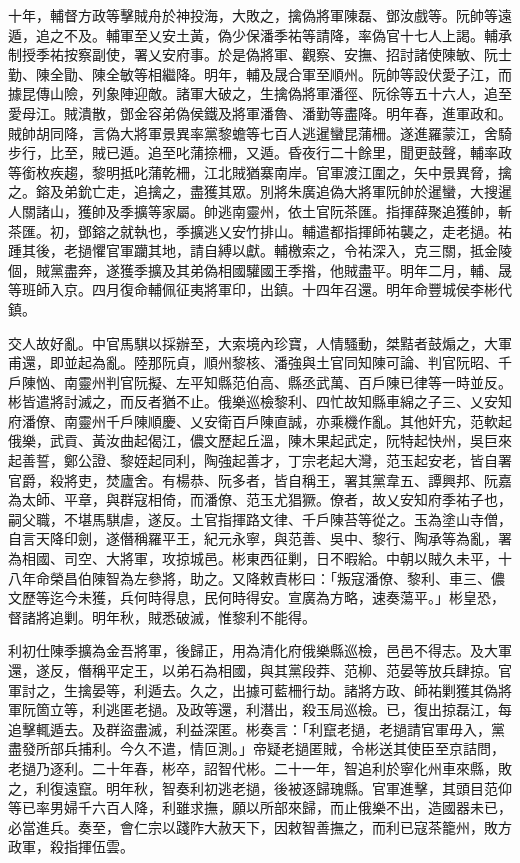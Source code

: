 \begin{pinyinscope}
十年，輔督方政等擊賊舟於神投海，大敗之，擒偽將軍陳磊、鄧汝戲等。阮帥等遠遁，追之不及。輔軍至乂安土黃，偽少保潘季祐等請降，率偽官十七人上謁。輔承制授季祐按察副使，署乂安府事。於是偽將軍、觀察、安撫、招討諸使陳敏、阮士勤、陳全勖、陳全敏等相繼降。明年，輔及晟合軍至順州。阮帥等設伏愛子江，而據昆傳山險，列象陣迎敵。諸軍大破之，生擒偽將軍潘徑、阮徐等五十六人，追至愛母江。賊潰散，鄧金容弟偽侯鐵及將軍潘魯、潘勤等盡降。明年春，進軍政和。賊帥胡同降，言偽大將軍景異率黨黎蟾等七百人逃暹蠻昆蒲柵。遂進羅蒙江，舍騎步行，比至，賊已遁。追至叱蒲捺柵，又遁。昏夜行二十餘里，聞更鼓聲，輔率政等銜枚疾趨，黎明抵叱蒲乾柵，江北賊猶寨南岸。官軍渡江圍之，矢中景異脅，擒之。鎔及弟鈗亡走，追擒之，盡獲其眾。別將朱廣追偽大將軍阮帥於暹蠻，大搜暹人關諸山，獲帥及季擴等家屬。帥逃南靈州，依土官阮茶匯。指揮薛聚追獲帥，斬茶匯。初，鄧鎔之就執也，季擴逃乂安竹排山。輔遣都指揮師祐襲之，走老撾。祐踵其後，老撾懼官軍躪其地，請自縛以獻。輔檄索之，令祐深入，克三關，抵金陵個，賊黨盡奔，遂獲季擴及其弟偽相國驩國王季揝，他賊盡平。明年二月，輔、晟等班師入京。四月復命輔佩征夷將軍印，出鎮。十四年召還。明年命豐城侯李彬代鎮。

交人故好亂。中官馬騏以採辦至，大索境內珍寶，人情騷動，桀黠者鼓煽之，大軍甫還，即並起為亂。陸那阮貞，順州黎核、潘強與土官同知陳可論、判官阮昭、千戶陳忷、南靈州判官阮擬、左平知縣范伯高、縣丞武萬、百戶陳已律等一時並反。彬皆遣將討滅之，而反者猶不止。俄樂巡檢黎利、四忙故知縣車綿之子三、乂安知府潘僚、南靈州千戶陳順慶、乂安衛百戶陳直誠，亦乘機作亂。其他奸宄，范軟起俄樂，武貢、黃汝曲起偈江，儂文歷起丘溫，陳木果起武定，阮特起快州，吳巨來起善誓，鄭公證、黎姪起同利，陶強起善才，丁宗老起大灣，范玉起安老，皆自署官爵，殺將吏，焚廬舍。有楊恭、阮多者，皆自稱王，署其黨韋五、譚興邦、阮嘉為太師、平章，與群寇相倚，而潘僚、范玉尤猖獗。僚者，故乂安知府季祐子也，嗣父職，不堪馬騏虐，遂反。土官指揮路文律、千戶陳苔等從之。玉為塗山寺僧，自言天降印劍，遂僭稱羅平王，紀元永寧，與范善、吳中、黎行、陶承等為亂，署為相國、司空、大將軍，攻掠城邑。彬東西征剿，日不暇給。中朝以賊久未平，十八年命榮昌伯陳智為左參將，助之。又降敕責彬曰：「叛寇潘僚、黎利、車三、儂文歷等迄今未獲，兵何時得息，民何時得安。宣廣為方略，速奏蕩平。」彬皇恐，督諸將追剿。明年秋，賊悉破滅，惟黎利不能得。

利初仕陳季擴為金吾將軍，後歸正，用為清化府俄樂縣巡檢，邑邑不得志。及大軍還，遂反，僭稱平定王，以弟石為相國，與其黨段莽、范柳、范晏等放兵肆掠。官軍討之，生擒晏等，利遁去。久之，出據可藍柵行劫。諸將方政、師祐剿獲其偽將軍阮箇立等，利逃匿老撾。及政等還，利潛出，殺玉局巡檢。已，復出掠磊江，每追擊輒遁去。及群盜盡滅，利益深匿。彬奏言：「利竄老撾，老撾請官軍毋入，黨盡發所部兵捕利。今久不遣，情叵測。」帝疑老撾匿賊，令彬送其使臣至京詰問，老撾乃逐利。二十年春，彬卒，詔智代彬。二十一年，智追利於寧化州車來縣，敗之，利復遠竄。明年秋，智奏利初逃老撾，後被逐歸瑰縣。官軍進擊，其頭目范仰等已率男婦千六百人降，利雖求撫，願以所部來歸，而止俄樂不出，造國器未已，必當進兵。奏至，會仁宗以踐阼大赦天下，因敕智善撫之，而利已寇茶籠州，敗方政軍，殺指揮伍雲。


\end{pinyinscope}
